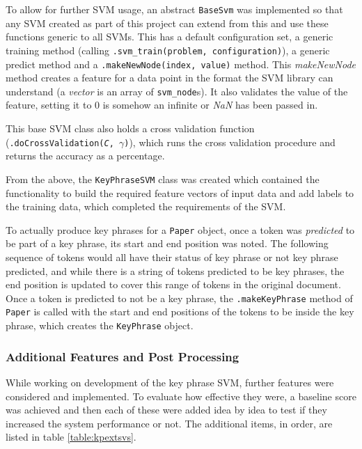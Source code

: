 To allow for further SVM usage, an abstract \texttt{BaseSvm} was implemented so that any SVM created as part of this project can extend from this and use these functions generic to all SVMs. This has a default configuration set, a generic training method (calling \texttt{.svm\_train(problem, configuration)}), a generic predict method and a \texttt{.makeNewNode(index, value)} method. This \textit{makeNewNode} method creates a feature for a data point in the format the SVM library can understand (a \textit{vector} is an array of \texttt{svm\_node}s). It also validates the value of the feature, setting it to 0 is somehow an infinite or \textit{NaN} has been passed in. 

This base SVM class also holds a cross validation function (\texttt{.doCrossValidation(\textit{C}, $\gamma$)}), which runs the cross validation procedure and returns the accuracy as a percentage.

From the above, the \texttt{KeyPhraseSVM} class was created which contained the functionality to build the required feature vectors of input data and add labels to the training data, which completed the requirements of the SVM.

To actually produce key phrases for a \texttt{Paper} object, once a token was \textit{predicted} to be part of a key phrase, its start and end position was noted. The following sequence of tokens would all have their status of key phrase or not key phrase predicted, and while there is a string of tokens predicted to be key phrases, the end position is updated to cover this range of tokens in the original document. Once a token is predicted to not be a key phrase, the \texttt{.makeKeyPhrase} method of \texttt{Paper} is called with the start and end positions of the tokens to be inside the key phrase, which creates the \texttt{KeyPhrase} object.

\subsubsection*{Additional Features and Post Processing}
While working on development of the key phrase SVM, further features were considered and implemented. To evaluate how effective they were, a baseline score was achieved and then each of these were added idea by idea to test if they increased the system performance or not. The additional items, in order, are listed in table \ref{table:kpextsvs}. 

